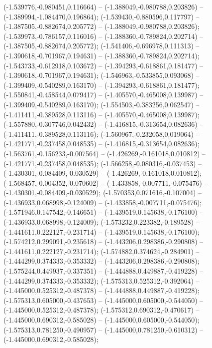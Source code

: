  (-1.539776,-0.980451,0.116664) -- (-1.388049,-0.980788,0.203826) -- (-1.389994,-1.084470,0.196864);
 (-1.539430,-0.880596,0.117797) -- (-1.387505,-0.882674,0.205772) -- (-1.388049,-0.980788,0.203826);
 (-1.539973,-0.786157,0.116016) -- (-1.388360,-0.789824,0.202714) -- (-1.387505,-0.882674,0.205772);
 (-1.541406,-0.696978,0.111313) -- (-1.390618,-0.701967,0.194631) -- (-1.388360,-0.789824,0.202714);
 (-1.543733,-0.612918,0.103672) -- (-1.394293,-0.618861,0.181477) -- (-1.390618,-0.701967,0.194631);
 (-1.546963,-0.533855,0.093068) -- (-1.399409,-0.540289,0.163170) -- (-1.394293,-0.618861,0.181477);
 (-1.550841,-0.458544,0.079417) -- (-1.405570,-0.465008,0.139987) -- (-1.399409,-0.540289,0.163170);
 (-1.554503,-0.383256,0.062547) -- (-1.411411,-0.389528,0.113116) -- (-1.405570,-0.465008,0.139987);
 (-1.557880,-0.307746,0.042432) -- (-1.416815,-0.313654,0.082636) -- (-1.411411,-0.389528,0.113116);
 (-1.560967,-0.232058,0.019064) -- (-1.421771,-0.237458,0.048535) -- (-1.416815,-0.313654,0.082636);
 (-1.563761,-0.156233,-0.007564) -- (-1.426269,-0.161018,0.010812) -- (-1.421771,-0.237458,0.048535);
 (-1.566258,-0.080316,-0.037453) -- (-1.430301,-0.084409,-0.030529) -- (-1.426269,-0.161018,0.010812);
 (-1.568457,-0.004352,-0.070602) -- (-1.433858,-0.007711,-0.075476) -- (-1.430301,-0.084409,-0.030529);
 (-1.570353,0.071616,-0.107004) -- (-1.436933,0.068998,-0.124009) -- (-1.433858,-0.007711,-0.075476);
 (-1.571946,0.147542,-0.146651) -- (-1.439519,0.145638,-0.176100) -- (-1.436933,0.068998,-0.124009);
 (-1.573232,0.223382,-0.189528) -- (-1.441611,0.222127,-0.231714) -- (-1.439519,0.145638,-0.176100);
 (-1.574212,0.299091,-0.235618) -- (-1.443206,0.298386,-0.290808) -- (-1.441611,0.222127,-0.231714);
 (-1.574882,0.374624,-0.284901) -- (-1.444299,0.374333,-0.353332) -- (-1.443206,0.298386,-0.290808);
 (-1.575244,0.449937,-0.337351) -- (-1.444888,0.449887,-0.419228) -- (-1.444299,0.374333,-0.353332);
 (-1.575313,0.525312,-0.392064) -- (-1.445000,0.525312,-0.487378) -- (-1.444888,0.449887,-0.419228);
 (-1.575313,0.605000,-0.437653) -- (-1.445000,0.605000,-0.544050) -- (-1.445000,0.525312,-0.487378);
 (-1.575312,0.690312,-0.470617) -- (-1.445000,0.690312,-0.585028) -- (-1.445000,0.605000,-0.544050);
 (-1.575313,0.781250,-0.490957) -- (-1.445000,0.781250,-0.610312) -- (-1.445000,0.690312,-0.585028);
